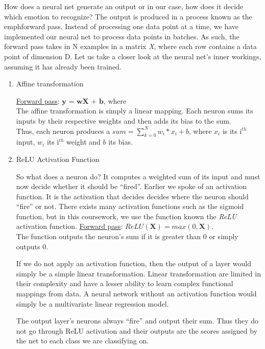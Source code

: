How does a neural net generate an output or in our case, how does it decide which emotion to recognize?
The output is produced in a process known as the emph{forward pass}.
Instead of processing one data point at a time,
we have implemented our neural net to process data points in batches.
As such, the forward pass takes in N examples in a matrix \emph{X}, where each row contains a data point of dimension D.
Let us take a closer look at the neural net's inner workings, assuming it has already been trained.

\begin{enumerate}
   \item Affine transformation
  
     \underline{Forward pass}: $\textbf{y = wX + b}$, where \\
     The affine transformation is simply a linear mapping.
     Each neuron sums its inputs by their respective weights and then adds its bias to the sum.\\
     Thus, each neuron produces a $sum = \sum_{k=0}^{N} w_i * x_i + b$,
     where $x_i$ is its i$^{th}$ input, $w_i$ its i$^{th}$ weight and $b$ its bias.
     
   \item ReLU Activation Function
     
     So what does a neuron do? It computes a weighted sum of its input and must now decide whether it should be ``fired''.
     Earlier we spoke of an activation function.
     It is the activation that decides decides where the neuron should ``fire'' or not. 
     There exists many activation functions such as the sigmoid function,
     but in this coursework, we use the function known the \emph{ReLU} activation function.
     \underline{Forward pass}: $ReLU(\textbf{X}) = max(0,\textbf{X})$.\\
     The function outputs the neuron's sum if it is greater than 0 or simply outputs 0.
     
     If we do not apply an activation function, then the output of a layer would simply be a simple linear transformation.
     Linear transformation are limited in their complexity and have a lesser ability to learn complex functional mappings from data.
     A neural network without an activation function would simply be a multivariate linear regression model.

     The output layer's neurons always ``fire'' and output their sum.
     Thus they do not go through ReLU activation and
     their outputs are the scores assigned by the net to each class we are classifying on.
     
\end{enumerate}
